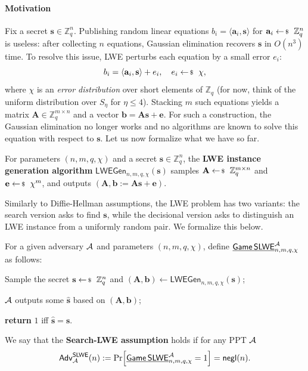 \documentclass[../../book.tex]{subfiles}
\begin{document}
\paragraph{Motivation}
Fix a secret $\mathbf{s} \in \mathbb{Z}_q^n$.
Publishing random linear equations $b_i = \langle \mathbf{a}_i, \mathbf{s} \rangle$ for $\mathbf{a}_i \leftarrowS \mathbb{Z}_q^n$ is useless: after collecting $n$ equations, Gaussian elimination recovers $\mathbf{s}$ in $O(n^3)$ time.
To resolve this issue, LWE perturbs each equation by a small error $e_i$:
\begin{equation*}
    b_i = \langle \mathbf{a}_i, \mathbf{s} \rangle + e_i, \quad e_i \leftarrowS \chi,
\end{equation*}
where $\chi$ is an \emph{error distribution} over short elements of $\mathbb{Z}_q$ (for now, think of the uniform distribution over $S_{\eta}$ for $\eta \leq 4$).
Stacking $m$ such equations yields a matrix $\mathbf{A} \in \mathbb{Z}_q^{m \times n}$ and a vector $\mathbf{b} = \mathbf{A}\mathbf{s} + \mathbf{e}$.
For such a construction, the Gaussian elimination no longer works and no algorithms are known to solve this equation with respect to $\mathbf{s}$.
Let us now formalize what we have so far.

\begin{definition}
    For parameters $(n,m,q,\chi)$ and a secret $\mathbf{s} \in \mathbb{Z}_q^n$, the \textbf{LWE instance generation algorithm} $\mathsf{LWEGen}_{n,m,q,\chi}(\mathbf{s})$ samples $\mathbf{A} \leftarrowS \mathbb{Z}_q^{m \times n}$ and $\mathbf{e} \leftarrowS \chi^m$, and outputs $(\mathbf{A}, \mathbf{b} := \mathbf{A}\mathbf{s}+\mathbf{e})$.
\end{definition}

Similarly to Diffie-Hellman assumptions, the LWE problem has two variants: the search version asks to find $\mathbf{s}$, while the decisional version asks to distinguish an LWE instance from a uniformly random pair.
We formalize this below.

\begin{definition}\label{def:slwe}
    For a given adversary $\mathcal{A}$ and parameters $(n,m,q,\chi)$, define $\underline{\mathsf{Game}\,\mathsf{SLWE}}^{\mathcal{A}}_{n,m,q,\chi}$ as follows:
    \begin{algoen}
        \item Sample the secret $\mathbf{s} \leftarrowS \mathbb{Z}_q^n$ and $(\mathbf{A},\mathbf{b}) \gets \mathsf{LWEGen}_{n,m,q,\chi}(\mathbf{s})$;
        \item $\mathcal{A}$ outputs some $\widehat{\mathbf{s}}$ based on $(\mathbf{A},\mathbf{b})$;
        \item \textbf{return} $1$ iff $\widehat{\mathbf{s}} = \mathbf{s}$.
    \end{algoen}
    We say that the \textbf{Search-LWE assumption} holds if for any PPT $\mathcal{A}$
    \begin{equation*}
        \mathsf{Adv}^{\mathsf{SLWE}}_{\mathcal{A}}(n) := \Pr[\underline{\mathsf{Game}\,\mathsf{SLWE}}^{\mathcal{A}}_{n,m,q,\chi} = 1] = \mathsf{negl}(n).
    \end{equation*}
\end{definition}
\end{document}
